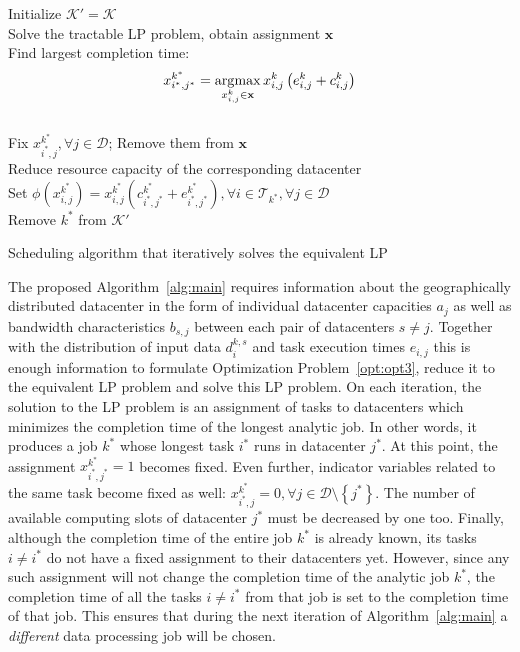 \begin{algorithm}[H]
  \label{alg:main}

  Initialize \(\mathcal{K}' = \mathcal{K}\) \\
   {
    Solve the tractable LP problem, obtain assignment \(\mathbf{x}\) \\
    Find largest completion time: \[x_{i^*, j^*}^{k^*} = \operatorname*{\arg\!\max}\limits_{x_{i, j}^k \in\mathbf{x}} x_{i, j}^k\left(e^k_{i, j} + c^k_{i, j}\right)\] \\
    Fix \(x_{i^*, j}^{k^*},\forall j\in\mathcal{D}\); Remove them from \(\mathbf{x}\) \\
    Reduce resource capacity of the corresponding datacenter \\
    Set \(\phi\left(x^{k^*}_{i, j}\right) = x^{k^*}_{i, j}\left(c^{k^*}_{i^*, j^*} + e^{k^*}_{i^*, j^*}\right),\forall i\in \mathcal{T}_{k^*}, \forall j\in \mathcal{D}\) \\
    Remove \(k^*\) from \(\mathcal{K}'\)
  }
  \caption{Scheduling algorithm that iteratively solves the equivalent LP}
\end{algorithm}

The proposed Algorithm~\ref{alg:main} requires information about the geographically distributed datacenter in the form of individual datacenter capacities \(a_j\) as well as bandwidth characteristics \(b_{s, j}\) between each pair of datacenters \(s\neq j\). Together with the distribution of input data \(d^{k, s}_i\) and task execution times \(e_{i, j}\) this is enough information to formulate Optimization Problem~\ref{opt:opt3}, reduce it to the equivalent LP problem and solve this LP problem. On each iteration, the solution to the LP problem is an assignment of tasks to datacenters which minimizes the completion time of the longest analytic job. In other words, it produces a job \(k^*\) whose longest task \(i^*\) runs in datacenter \(j^*\). At this point, the assignment \(x^{k^*}_{i^*, j^*} = 1\) becomes fixed. Even further, indicator variables related to the same task become fixed as well: \(x^{k^*}_{i^*, j}=0, \forall j\in\mathcal{D}\setminus \left\{j^*\right\}\). The number of available computing slots of datacenter \(j^*\) must be decreased by one too. Finally, although the completion time of the entire job \(k^*\) is already known, its tasks \(i\neq i^*\) do not have a fixed assignment to their datacenters yet. However, since any such assignment will not change the completion time of the analytic job \(k^*\), the completion time of all the tasks \(i\neq i^*\) from that job is set to the completion time of that job. This ensures that during the next iteration of Algorithm~\ref{alg:main} a \emph{different} data processing job will be chosen.

